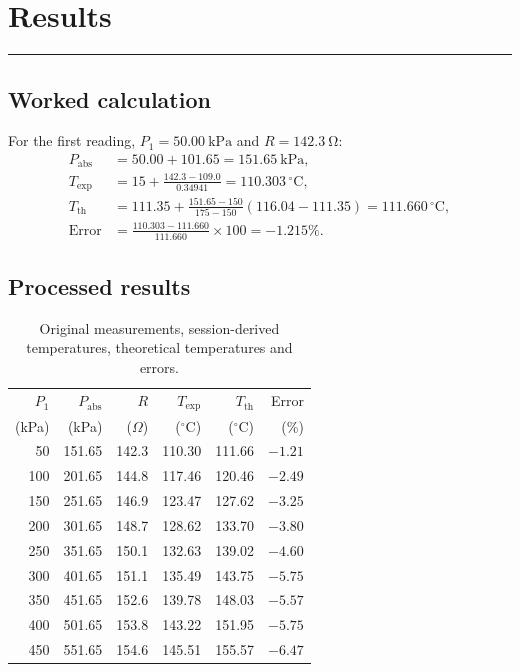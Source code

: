\documentclass[11pt,a4paper]{article}
\newcommand{\sectionrule}{\vspace{-2pt}\color{rulegray}\hrule\color{black}\vspace{5pt}}
\begin{document}
\section{Results}
\sectionrule
\subsection{Worked calculation}
For the first reading, $P_1=\SI{50.00}{\kilo\pascal}$ and
$R=\SI{142.3}{\ohm}$:
\begin{align}
 P_{\mathrm{abs}}&=50.00+101.65=\SI{151.65}{\kilo\pascal},\\
 T_{\mathrm{exp}}&=15+\frac{142.3-109.0}{0.34941}
 =110.303\,{}^\circ\mathrm{C},\\
 T_{\mathrm{th}}&=111.35+\frac{151.65-150}{175-150}(116.04-111.35)
 =111.660\,{}^\circ\mathrm{C},\\
 \mathrm{Error}&=\frac{110.303-111.660}{111.660}\times100=-1.215\%.
\end{align}

\subsection{Processed results}
\begin{table}[H]
  \centering
  \caption{Original measurements, session-derived temperatures, theoretical temperatures and errors.}
  \label{tab:results}
  \small
  \begin{tabular}{rrrrrr}
    \toprule
    $P_1$ & $P_{\mathrm{abs}}$ & $R$ & $T_{\mathrm{exp}}$ & $T_{\mathrm{th}}$ & Error \\
    (kPa) & (kPa) & ($\Omega$) & ($^\circ$C) & ($^\circ$C) & (\%) \\
    \midrule
     50 & 151.65 & 142.3 & 110.30 & 111.66 & $-1.21$ \\
    100 & 201.65 & 144.8 & 117.46 & 120.46 & $-2.49$ \\
    150 & 251.65 & 146.9 & 123.47 & 127.62 & $-3.25$ \\
    200 & 301.65 & 148.7 & 128.62 & 133.70 & $-3.80$ \\
    250 & 351.65 & 150.1 & 132.63 & 139.02 & $-4.60$ \\
    300 & 401.65 & 151.1 & 135.49 & 143.75 & $-5.75$ \\
    350 & 451.65 & 152.6 & 139.78 & 148.03 & $-5.57$ \\
    400 & 501.65 & 153.8 & 143.22 & 151.95 & $-5.75$ \\
    450 & 551.65 & 154.6 & 145.51 & 155.57 & $-6.47$ \\
    \bottomrule
  \end{tabular}
\end{table}
\end{document}
